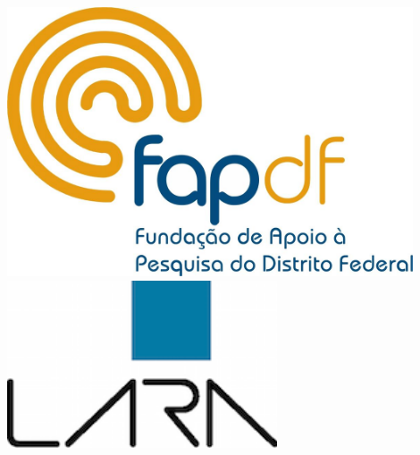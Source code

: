 \documentclass[a0,portrait]{a0poster}
\begin{document}


\begin{minipage}[b]{0.12\linewidth}
\includegraphics[width=12cm]{imgs/fap.jpg} \vspace{1cm}\\
\thinspace \includegraphics[width=8cm]{imgs/laralogo2.png}\\
\end{minipage}
%
\end{document}

